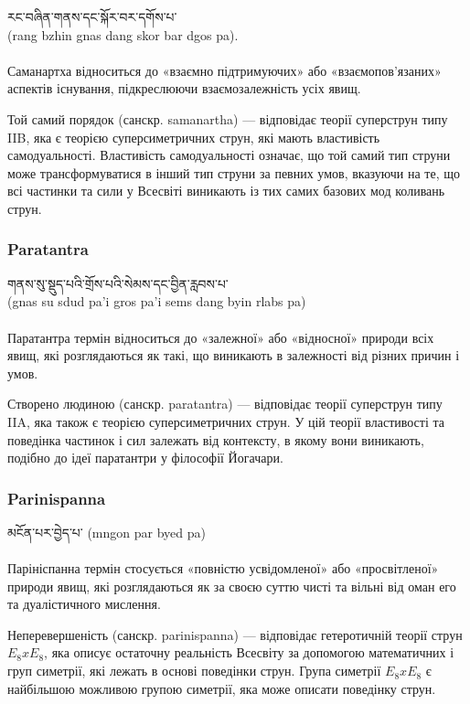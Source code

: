 \ti རང་བཞིན་གནས་དང་སྐོར་བར་དགོས་པ་ 
\\
\ua (rang bzhin gnas dang skor bar dgos pa).\\
\\
Саманартха відноситься до «взаємно підтримуючих» або «взаємопов'язаних»
аспектів існування, підкреслюючи взаємозалежність усіх явищ.

Той самий порядок (санскр. samanartha) — відповідає теорії суперструн типу IIB,
яка є теорією суперсиметричних струн, які мають властивість самодуальності.
Властивість самодуальності означає, що той самий тип струни може трансформуватися
в інший тип струни за певних умов, вказуючи на те, що всі частинки та сили у
Всесвіті виникають із тих самих базових мод коливань струн.

\subsubsection*{Paratantra}

\ti གནས་སུ་སྡུད་པའི་གྲོས་པའི་སེམས་དང་བྱིན་རླབས་པ་  
\\
\ua (gnas su sdud pa'i gros pa'i sems dang byin rlabs pa)\\
\\
Паратантра термін відноситься до «залежної» або «відносної» природи всіх явищ,
які розглядаються як такі, що виникають в залежності від різних причин і умов.

Створено людиною (санскр. paratantra) --- відповідає теорії суперструн типу IIA,
яка також є теорією суперсиметричних струн. У цій теорії властивості та поведінка
частинок і сил залежать від контексту, в якому вони виникають, подібно до ідеї
паратантри у філософії Йогачари.

\newpage
\subsubsection*{Parinispanna}

\ti མངོན་པར་བྱེད་པ་  \ua (mngon par byed pa)\\
\\
Парініспанна термін стосується «повністю усвідомленої» або «просвітленої» природи
явищ, які розглядаються як за своєю суттю чисті та вільні від оман его та
дуалістичного мислення.

Неперевершеність (санскр. parinispanna) --- відповідає гетеротичній теорії струн $E_8 x E_8$,
яка описує остаточну реальність Всесвіту за допомогою математичних і груп симетрії, які
лежать в основі поведінки струн. Група симетрії $E_8 x E_8$ є найбільшою можливою групою симетрії,
яка може описати поведінку струн.

